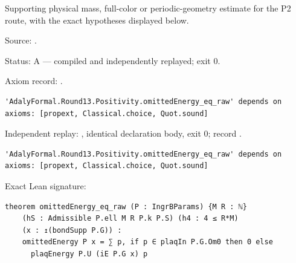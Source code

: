 \begin{theorem}[bp-464]
\label{bp-464}
\leanok
Supporting physical mass, full-color or periodic-geometry estimate for the P2 route, with the exact hypotheses displayed below.

\par Source: \texttt{}.
\par Status: A — compiled and independently replayed; exit 0.
\par Axiom record: \texttt{}.
\begin{verbatim}
'AdalyFormal.Round13.Positivity.omittedEnergy_eq_raw' depends on axioms: [propext, Classical.choice, Quot.sound]
\end{verbatim}
\par Independent replay: \texttt{}, identical declaration body, exit 0; record \texttt{}.
\begin{verbatim}
'AdalyFormal.Round13.Positivity.omittedEnergy_eq_raw' depends on axioms: [propext, Classical.choice, Quot.sound]
\end{verbatim}
\par Exact Lean signature:
\begin{verbatim}
theorem omittedEnergy_eq_raw (P : IngrBParams) {M R : ℕ}
    (hS : Admissible P.ell M R P.k P.S) (h4 : 4 ≤ R*M)
    (x : ↥(bondSupp P.G)) :
    omittedEnergy P x = ∑ p, if p ∈ plaqIn P.G.Om0 then 0 else
      plaqEnergy P.U (iE P.G x) p
\end{verbatim}
\end{theorem}

